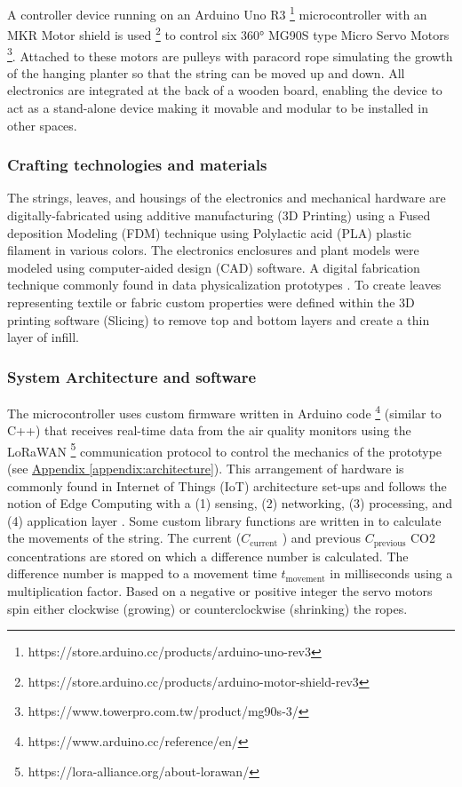 A controller device running on an Arduino Uno R3 \footnote{https://store.arduino.cc/products/arduino-uno-rev3} microcontroller with an MKR Motor shield is used \footnote{https://store.arduino.cc/products/arduino-motor-shield-rev3} to control six 360° MG90S type Micro Servo Motors \footnote{https://www.towerpro.com.tw/product/mg90s-3/}. Attached to these motors are pulleys with paracord rope simulating the growth of the hanging planter so that the string can be moved up and down. All electronics are integrated at the back of a wooden board, enabling the device to act as a stand-alone device making it movable and modular to be installed in other spaces.


\subsubsection{Crafting technologies and materials}
The strings, leaves, and housings of the electronics and mechanical hardware are digitally-fabricated using additive manufacturing (3D Printing) using a Fused deposition Modeling (FDM) technique using Polylactic acid (PLA) plastic filament in various colors. The electronics enclosures and plant models were modeled using computer-aided design (CAD) software. A digital fabrication technique commonly found in data physicalization prototypes \cite{anhalt_university_germany_design_2022}. To create leaves representing textile or fabric custom properties were defined within the 3D printing software (Slicing) to remove top and bottom layers and create a thin layer of infill.

\subsubsection{System Architecture and software}

The microcontroller uses custom firmware written in Arduino code \footnote{https://www.arduino.cc/reference/en/} (similar to C++) that receives real-time data from the air quality monitors using the LoRaWAN \footnote{https://lora-alliance.org/about-lorawan/} communication protocol to control the mechanics of the prototype (see \hyperref[appendix:architecture]{Appendix \ref*{appendix:architecture}}). This arrangement of hardware is commonly found in Internet of Things (IoT) architecture set-ups and follows the notion of Edge Computing with a (1) sensing, (2) networking, (3) processing, and (4) application layer \cite{li_edge-oriented_2019, idrees_edge_2018}. Some custom library functions are written in to calculate the movements of the string. The current (\( C_{\text{current}} \) ) and previous \( C_{\text{previous}} \) CO2 concentrations are stored on which a difference number is calculated. The difference number is mapped to a movement time \( t_{\text{movement}} \) in milliseconds using a multiplication factor. Based on a negative or positive integer the servo motors spin either clockwise (growing) or counterclockwise (shrinking) the ropes.


